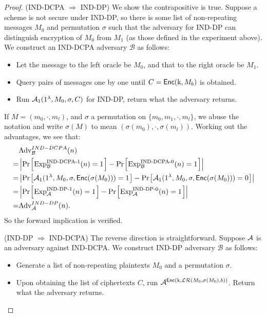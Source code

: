 \begin{proof}
(IND-DCPA $\Rightarrow$ IND-DP) We show the contrapositive is true. Suppose a scheme is not secure under IND-DP, so there is some list of non-repeating messages $M_0$ and permutation $\sigma$ such that the adversary for IND-DP can distinguish encryption of $M_0$ from $M_1$ (as those defined in the experiment above). We construct an IND-DCPA adversary $\mathcal{B}$ as follows:
\begin{itemize}
	\item Let the message to the left oracle be $M_0$, and that to the right oracle be $M_1$.
	\item Query pairs of messages one by one until $C = \mathsf{Enc}(\text{k}, M_b)$ is obtained.
	\item Run $\mathcal{A}_1(1^{\lambda}, M_0, \sigma, C)$ for IND-DP, return what the adversary returns. 
\end{itemize}

If $M = (m_0, \cdot, m_l)$, and $\sigma$ a permutation on $\{m_0, m_1, \cdot, m_l\}$, we abuse the notation and write $\sigma(M)$ to mean $(\sigma(m_0), \cdot, \sigma(m_l))$. Working out the advantages, we see that:
\begin{align*}
  & \advantage_{\mathcal{B}}^{IND-DCPA}(n) \\
= & \left| \prob{\text{Exp}_{\mathcal{B}}^{\text{IND-DCPA-1}}(n) = 1} - \prob{\text{Exp}_{\mathcal{B}}^{\text{IND-DCPA-0}}(n) = 1} \right| \\
= & \left| \prob{\adv_1(\secparam, M_0, \sigma, \enc(\sigma(M_0))) = 1} - \prob{\adv_1(\secparam, M_0, \sigma, \enc(\sigma(M_0))) = 0} \right| \\
= &\left| \prob{\text{Exp}_{\adv}^{\text{IND-DP-1}}(n) = 1} - \prob{\text{Exp}_{\adv}^{\text{IND-DP-0}}(n) = 1} \right| \\
= & \advantage_{\adv}^{IND-DP}(n).
\end{align*}
So the forward implication is verified.

(IND-DP $\Rightarrow$ IND-DCPA) The reverse direction is straightforward. Suppose $\mathcal{A}$ is an adversary against IND-DCPA. We construct IND-DP adversary $\mathcal{B}$ as follows:
\begin{itemize}
	\item Generate a list of non-repeating plaintexts $M_0$ and a permutation $\sigma$.
	\item Upon obtaining the list of ciphertexts $C$, run $\mathcal{A}^{\mathsf{Enc}(\text{k}, \mathcal{LR}(M_0, \sigma(M_0), b))}$. Return what the adversary returns.
\end{itemize}


\end{proof}
